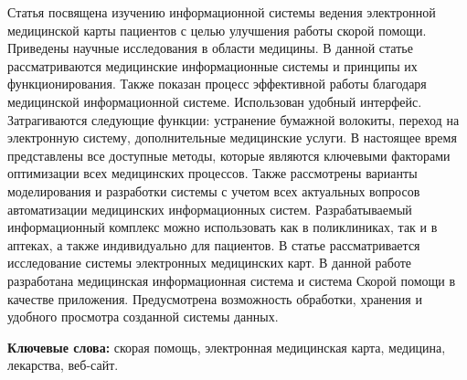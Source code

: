 Статья посвящена изучению информационной системы
ведения электронной медицинской карты пациентов с целью улучшения работы
скорой помощи. Приведены научные исследования в области медицины. В
данной статье рассматриваются медицинские информационные системы и
принципы их функционирования. Также показан процесс эффективной работы
благодаря медицинской информационной системе. Использован удобный
интерфейс. Затрагиваются следующие функции: устранение бумажной
волокиты, переход на электронную систему, дополнительные медицинские
услуги. В настоящее время представлены все доступные методы, которые
являются ключевыми факторами оптимизации всех медицинских процессов.
Также рассмотрены варианты моделирования и разработки системы с учетом
всех актуальных вопросов автоматизации медицинских информационных
систем. Разрабатываемый информационный комплекс можно использовать как в
поликлиниках, так и в аптеках, а также индивидуально для пациентов. В
статье рассматривается исследование системы электронных медицинских
карт. В данной работе разработана медицинская информационная система и
система Скорой помощи в качестве приложения. Предусмотрена возможность
обработки, хранения и удобного просмотра созданной системы данных.

{\bfseries Ключевые слова:} скорая помощь, электронная медицинская карта,
медицина, лекарства, веб-сайт.

